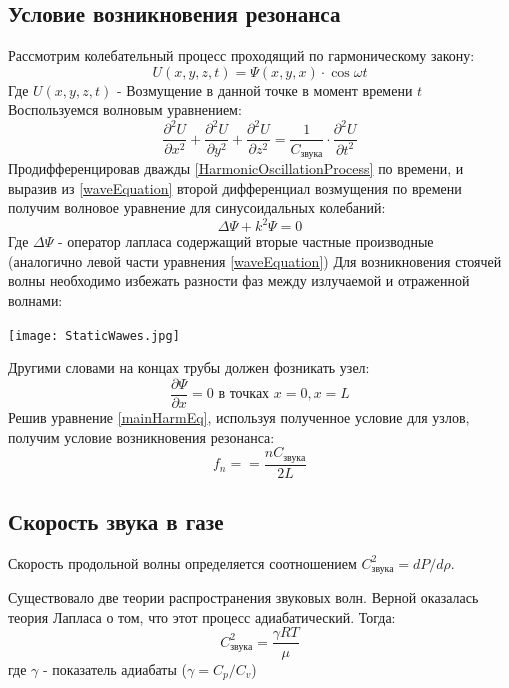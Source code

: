 \documentclass{article}
\begin{document}
\subsection{Условие возникновения резонанса}
Рассмотрим колебательный процесс проходящий по гармоническому закону:
\begin{equation}\label{HarmonicOscillationProcess}
    U(x,y,z,t) = \Psi(x,y,x) \cdot \cos{\omega t}
\end{equation}
Где $U(x,y,z,t)$ - Возмущение в данной точке в момент времени $t$
Воспользуемся волновым уравнением:
\begin{equation}\label{waveEquation}
   \frac{ \partial^2 U}{\partial x^2} + \frac{ \partial^2 U}{\partial y^2} + \frac{ \partial^2 U}{\partial z^2} = \frac{1}{C_{\text{звука}}} \cdot \frac{\partial^2 U}{\partial t^2}
\end{equation}
Продифференцировав дважды \eqref{HarmonicOscillationProcess} по времени, и выразив из \eqref{waveEquation} второй дифференциал возмущения по времени получим волновое уравнение для синусоидальных колебаний:
\begin{equation}\label{mainHarmEq}
    \Delta \Psi + k^2 \Psi = 0
\end{equation}
Где $\Delta \Psi$ - оператор лапласа содержащий вторые частные производные (аналогично левой части уравнения \eqref{waveEquation})
\newpage
Для возникновения стоячей волны необходимо избежать разности фаз между излучаемой и отраженной волнами:
\begin{center}
\texttt{[image: StaticWawes.jpg]}
\end{center}
Другими словами на концах трубы должен фозникать узел:
\begin{equation*}
    \frac{\partial \Psi}{\partial x} = 0  \text{ в точках }
    x = 0, x = L
\end{equation*}
Решив уравнение \eqref{mainHarmEq}, используя полученное условие для узлов, получим условие возникновения резонанса:
\begin{equation}\label{resonance}
    f_{n} = = \frac{n C_{\text{звука}}}{2L}
\end{equation}
\subsection{Скорость звука в газе}
Скорость продольной волны определяется соотношением $C_{\text{звука}}^2 = d P/ d \rho$. 

Существовало две теории распространения звуковых волн. Верной оказалась теория Лапласа о том, что этот процесс адиабатический. 
Тогда:
\begin{equation}\label{speedOfSound}
C_{\text{звука}}^2 = \frac{\gamma R T}{\mu}
\end{equation}
где $\gamma$ - показатель адиабаты ($\gamma = C_{p}/C_{v}$)
\end{document}
